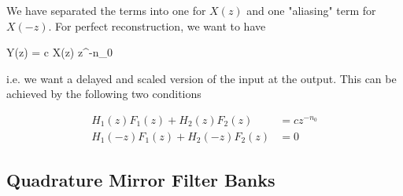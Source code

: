 We have separated the terms into one for $X(z)$ and one "aliasing" term for $X(-z)$. For perfect reconstruction, we want to have

\bee
Y(z) = c X(z) z^{-n_0}
\eee

i.e. we want a delayed and scaled version of the input at the output. This can be achieved by the following two conditions

\begin{align*}
H_1(z) F_1(z) + H_2(z) F_2(z) &= c z^{-n_0} \\
H_1(-z) F_1(z) + H_2(-z) F_2(z) &= 0
\end{align*}


\subsection*{Quadrature Mirror Filter Banks}





